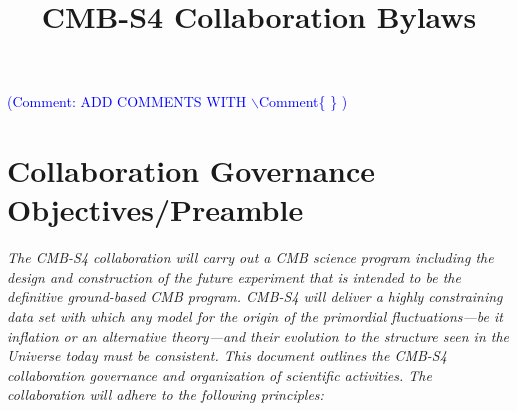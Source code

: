 \documentclass[12pt]{article}
\newcommand{\Comment}[1]{\textcolor{Blue}{(Comment: #1)}}
\begin{document}
\title{CMB-S4 Collaboration Bylaws}
\maketitle
%

\tableofcontents

\Comment{ADD COMMENTS WITH $\backslash$Comment\{ \} }

\newpage

\section{Collaboration Governance Objectives/Preamble}

{ \it 
The CMB-S4 collaboration will carry out a CMB science program including the design and construction of the future experiment that is intended to be the definitive ground-based CMB program. CMB-S4 will deliver a highly constraining data set with which any model for the origin of the primordial fluctuations---be it inflation or an alternative theory---and their evolution to the structure seen in the Universe today must be consistent. This document outlines the CMB-S4 collaboration governance and organization of scientific activities. The collaboration will adhere to the following principles:
}
\end{document}
